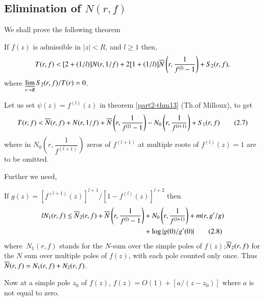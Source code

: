 \subsection{Elimination of \texorpdfstring{$N(r,f)$}{Nrf}}\label{part2-sec2.6}

We shall prove the following theorem

\begin{thm}\label{part2-thm17}
If $f(z)$ is admissible in $|z|<R$, and $l\geq 1$ then,
$$
T(r,f)<[2+(1/l)]N(r,1/f)+2[1+(1/l)]\overline{N}\left(r,\frac{1}{f^{(l)}-1}\right)+S_{2}(r,f), 
$$
where $\mathop{\underline{\lim}}\limits_{r\to R}S_{2}(r,f)/T(r)=0$.
\end{thm}

Let us set $\psi(z)=f^{(l)}(z)$ in theorem \ref{part2-thm13} (Th.\@ of
Milloux), to get
\begin{equation*}
T(r,f)<\overline{N}(r,f)+N(r,1/f)+\overline{N}\left(r,\frac{1}{f^{(l)}-1}\right)-N_{0}\left(r,\frac{1}{f^{(l+1)}}\right)+S_{1}(r,f)\tag{2.7}\label{part2-eq2.7}
\end{equation*}
where in $N_{0}\left(r,\dfrac{1}{f^{(l+1)}}\right)$ zeros of
$f^{(l+1)}$ at multiple roots of $f^{(l)}(z)=1$ are to be omitted.

Further we need,

\begin{lem}\label{part2-lem9}
If $g(z)=\left[f^{(l+1)}(z)\right]^{l+1}/[1-f^{(l)}(z)]^{l+2}$ then 
\begin{align*}
lN_{1}(r,f)\leq
\overline{N}_{2}(r,f)+\overline{N}\left(r,\frac{1}{f^{(l)}-1}\right) &+
N_{0}\left(r,\frac{1}{f^{(l+1)}}\right)+m(r,g'/g)\\
&+ \log|g(0)/g'(0)|\tag{2.8}\label{part2-eq2.8}
\end{align*}
where\pageoriginale\ $N_{1}(r,f)$ stands for the $N$-sum over the
simple poles of $f(z)$;\break $\overline{N}_{2}(r,f)$ for the $N$ sum over
multiple poles of $f(z)$, with each pole counted only once. Thus
$\overline{N}(r,f)=N_{1}(r,f)+N_{2}(r,f)$. 
\end{lem}

Now at a simple pole $z_{0}$ of $f(z)$, $f(z)=O(1)+[a/(z-z_{0})]$
where $a$ is not equal to zero.

